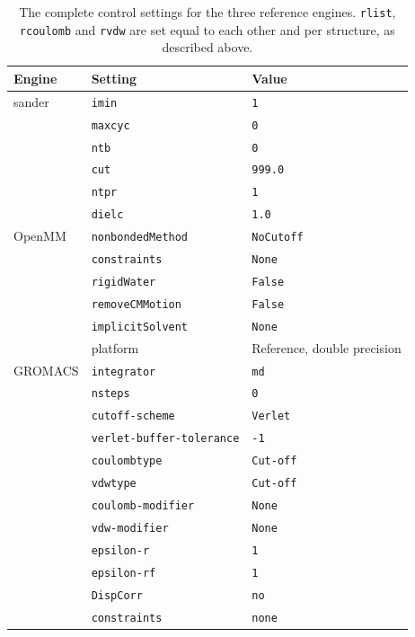 \begin{table}[h]
\centering
\footnotesize
\caption{The complete control settings for the three reference engines.
\texttt{rlist}, \texttt{rcoulomb} and \texttt{rvdw} are set equal to each other
and per structure, as described above.}
\label{tab:si-controls}
\begin{tabular}{lll}
\toprule
Engine & Setting & Value \\
\midrule
sander  & \texttt{imin}   & \texttt{1} \\
        & \texttt{maxcyc} & \texttt{0} \\
        & \texttt{ntb}    & \texttt{0} \\
        & \texttt{cut}    & \texttt{999.0} \\
        & \texttt{ntpr}   & \texttt{1} \\
        & \texttt{dielc}  & \texttt{1.0} \\
\midrule
OpenMM  & \texttt{nonbondedMethod} & \texttt{NoCutoff} \\
        & \texttt{constraints}     & \texttt{None} \\
        & \texttt{rigidWater}      & \texttt{False} \\
        & \texttt{removeCMMotion}  & \texttt{False} \\
        & \texttt{implicitSolvent} & \texttt{None} \\
        & platform                 & Reference, double precision \\
\midrule
GROMACS & \texttt{integrator}     & \texttt{md} \\
        & \texttt{nsteps}         & \texttt{0} \\
        & \texttt{cutoff-scheme}  & \texttt{Verlet} \\
        & \texttt{verlet-buffer-tolerance} & \texttt{-1} \\
        & \texttt{coulombtype}    & \texttt{Cut-off} \\
        & \texttt{vdwtype}        & \texttt{Cut-off} \\
        & \texttt{coulomb-modifier} & \texttt{None} \\
        & \texttt{vdw-modifier}   & \texttt{None} \\
        & \texttt{epsilon-r}      & \texttt{1} \\
        & \texttt{epsilon-rf}     & \texttt{1} \\
        & \texttt{DispCorr}       & \texttt{no} \\
        & \texttt{constraints}    & \texttt{none} \\
\bottomrule
\end{tabular}
\end{table}

